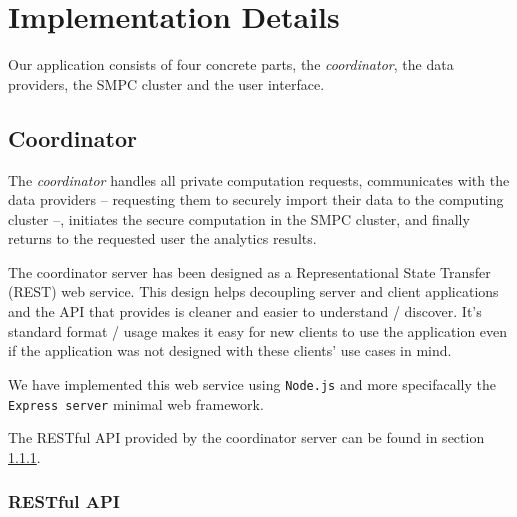 \chapter{Implementation Details}\label{c:implementation}

Our application consists of four concrete parts, the \textit{coordinator}, the data providers, the SMPC cluster and the user interface.

\section{Coordinator}\label{s:impl-coordinator}
The \textit{coordinator} handles all private computation requests, communicates with the data providers -- requesting them to securely import their data to the computing cluster --, initiates the secure computation in the SMPC cluster, and finally returns to the requested user the analytics results.

The coordinator server has been designed as a Representational State Transfer (REST) web service.
This design helps decoupling server and client applications and the API that provides is cleaner and easier to understand / discover.
It's standard format / usage makes it easy for new clients to use the application even if the application was not designed with these clients' use cases in mind.

We have implemented this web service using \texttt{Node.js} and more specifacally the \texttt{Express server} minimal web framework.

The RESTful API provided by the coordinator server can be found in section \ref{ss:coord-restful-api}.


\subsection{RESTful API}\label{ss:coord-restful-api}



